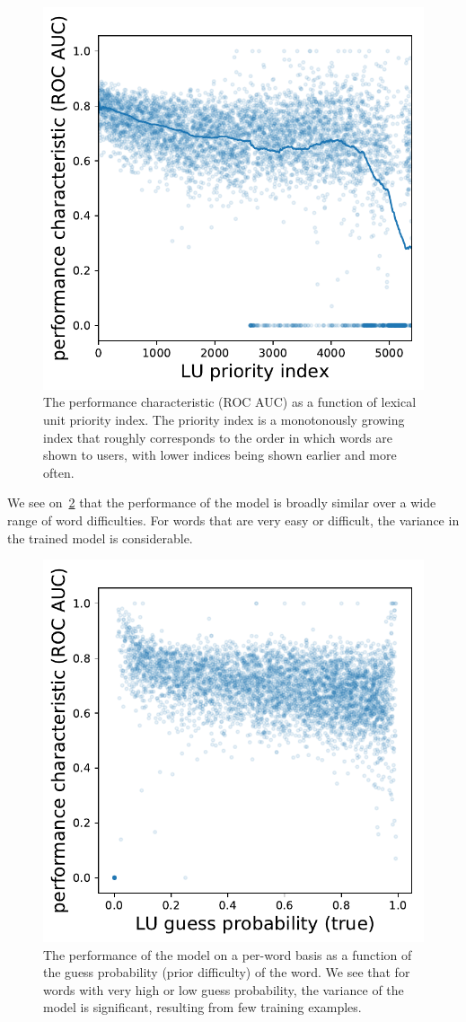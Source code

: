 \begin{figure}[ht]
\centering
\includegraphics[width=0.5\linewidth]{figures/lingvist/lu_roc_prio.pdf}
\caption{The performance characteristic (ROC AUC) as a function of lexical unit priority index. The priority index is a monotonously growing index that roughly corresponds to the order in which words are shown to users, with lower indices being shown earlier and more often.}
\label{fig:lu_roc_prio}
\end{figure}

We see on~\cref{fig:lu_roc_guess_proba} that the performance of the model is broadly similar over a wide range of word difficulties. For words that are very easy or difficult, the variance in the trained model is considerable.

\begin{figure}[ht]
\centering
\includegraphics[width=0.5\linewidth]{figures/lingvist/lu_roc_guess_proba.pdf}
\caption{The performance of the model on a per-word basis as a function of the guess probability (prior difficulty) of the word. We see that for words with very high or low guess probability, the variance of the model is significant, resulting from few training examples.}
\label{fig:lu_roc_guess_proba}
\end{figure}


